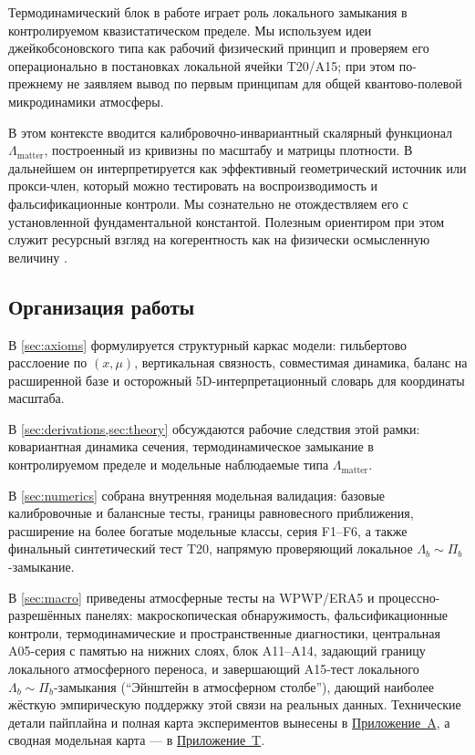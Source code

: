 \documentclass[11pt,a4paper]{article}
\theoremstyle{definition}
\theoremstyle{plain}
\theoremstyle{remark}
\begin{document}
Термодинамический блок в работе играет роль локального замыкания в контролируемом квазистатическом пределе. Мы используем идеи джейкобсоновского типа \cite{Jacobson1995EinsteinEOS,ElingGuedensJacobson2009NonEq} как рабочий физический принцип и проверяем его операционально в постановках локальной ячейки T20/A15; при этом по-прежнему не заявляем вывод по первым принципам для общей квантово-полевой микродинамики атмосферы.

В этом контексте вводится калибровочно-инвариантный скалярный функционал $\Lambda_{\mathrm{matter}}$, построенный из кривизны по масштабу и матрицы плотности. В дальнейшем он интерпретируется как эффективный геометрический источник или прокси-член, который можно тестировать на воспроизводимость и фальсификационные контроли. Мы сознательно не отождествляем его с установленной фундаментальной константой. Полезным ориентиром при этом служит ресурсный взгляд на когерентность как на физически осмысленную величину \cite{BaumgratzCramerPlenio2014QuantifyingCoherence}.

\subsection{Организация работы}

В \cref{sec:axioms} формулируется структурный каркас модели: гильбертово расслоение по $(x,\mu)$, вертикальная связность, совместимая динамика, баланс на расширенной базе и осторожный 5D-интерпретационный словарь для координаты масштаба.

В \cref{sec:derivations,sec:theory} обсуждаются рабочие следствия этой рамки: ковариантная динамика сечения, термодинамическое замыкание в контролируемом пределе и модельные наблюдаемые типа $\Lambda_{\mathrm{matter}}$.

В \cref{sec:numerics} собрана внутренняя модельная валидация: базовые калибровочные и балансные тесты, границы равновесного приближения, расширение на более богатые модельные классы, серия F1--F6, а также финальный синтетический тест T20, напрямую проверяющий локальное $\Lambda_b\sim\Pi_b$-замыкание.

В \cref{sec:macro} приведены атмосферные тесты на WPWP/ERA5 и процессно-разрешённых панелях: макроскопическая обнаружимость, фальсификационные контроли, термодинамические и пространственные диагностики, центральная A05-серия с памятью на нижних слоях, блок A11--A14, задающий границу локального атмосферного переноса, и завершающий A15-тест локального $\Lambda_b\sim\Pi_b$-замыкания (``Эйнштейн в атмосферном столбе''), дающий наиболее жёсткую эмпирическую поддержку этой связи на реальных данных. Технические детали пайплайна и полная карта экспериментов вынесены в \hyperref[sec:appendix:atmo]{Приложение~A}, а сводная модельная карта --- в \hyperref[sec:appendix:toy]{Приложение~T}.
\end{document}

